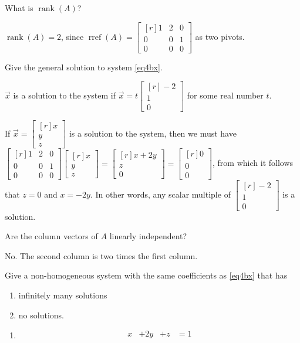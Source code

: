 \documentclass{problemset}
\DeclareMathOperator{\Rref}{rref}
\DeclareMathOperator{\Rank}{rank}
\newcommand{\rref}{\Rref}
\newcommand{\mat}[1]{\begin{bmatrix*}[r]#1\end{bmatrix*}}
\begin{document}
	\begin{parts}
		\item What is $\Rank(A)$?
			\begin{solution}
				$\Rank(A)=2$, since $\rref(A)=\mat{1&2&0\\0&0&1\\0&0&0}$ as two pivots.
			\end{solution}
		\item Give the general solution to system \eqref{eq4bx}.
			\begin{solution}
				$\vec x$ is a solution to the system if
				$\vec x=t\mat{-2\\1\\0}$ for some real number $t$.

				If $\vec x=\mat{x\\y\\z}$ is a solution to the system, then we
				must have $\mat{1&2&0\\0&0&1\\0&0&0}\mat{x\\y\\z}=\mat{x+2y\\z\\0}=\mat{0\\0\\0}$,
				from which it follows that $z=0$ and $x=-2y$. In other words,
				any scalar multiple of $\mat{-2\\1\\0}$ is a solution.
			\end{solution}
		\item Are the column vectors of $A$ linearly independent?
			\begin{solution}
				No. The second column is two times the first column.
			\end{solution}
		\item Give a non-homogeneous system with the same coefficients as \eqref{eq4bx} that has
			\begin{enumerate}
				\item infinitely many solutions
				\item no solutions.
			\end{enumerate}
			\begin{solution}
				\begin{enumerate}
					\item
						\begin{equation*}
							\begin{array}{llll}
								x&+2y&+z &= 1\\

\end{array}
\end{equation*}
\end{enumerate}
\end{solution}
\end{parts}
\end{document}
